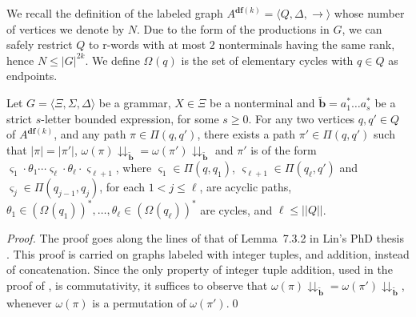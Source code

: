 \documentclass[final]{llncs}
\def\tuple#1{{\langle #1 \rangle}}
\def\card#1{{|\!|{#1}|\!|}}
\def\len#1{{\vert{#1}\vert}}
\def\prod{\Delta}
\def\patt{{\widetilde{\mathbf{b}}}}
\def\df#1{\scriptscriptstyle\mathbf{df}(#1)}
\def\Vars{\ensuremath{\Xi}}
\newcommand{\cycles}[2]{\Omega_{{#1}}({#2})}
\newcommand{\cyclestar}[2]{(\Omega_{{#1}}({#2}))^*}
\newcommand{\projpatt}[1]{{#1}\mathclose{\downdownarrows}_{{\patt}}}
\begin{document}
We recall the definition of the labeled graph
\(A^{\df{k}}= \tuple{ Q, \prod, \rightarrow}\)
whose number of vertices we denote by \(N\). Due to the form of the
productions in \(G\), we can safely restrict \(Q\) to r-words with at
most $2$ nonterminals having the same rank,
hence \(N \leq \len{G}^{2k}\). We define $\cycles{}{q}$ is the set of
elementary cycles with $q \in Q$ as endpoints.

\begin{proposition}\label{prop:weighted-graph-decomposition}
Let $G = \tuple{\Vars, \Sigma, \prod}$ be a grammar, $X \in \Vars$ be
a nonterminal and $\patt = a_1^* \ldots a_s^*$ be a strict $s$-letter bounded
expression, for some $s \geq 0$. For any two vertices
$q,q' \in Q$ of $A^{\df{k}}$, and any path
$\pi \in \Pi(q,q')$, there exists a path $\pi' \in \Pi(q,q')$ such
that $\len{\pi} = \len{\pi'}$, $\projpatt{\omega(\pi)}
= \projpatt{\omega(\pi')}$ and $\pi'$ is of the form
$\varsigma_1 \cdot \theta_1 \cdots \varsigma_\ell \cdot \theta_\ell \cdot \varsigma_{\ell+1}$,
where \(\varsigma_1 \in \Pi(q,q_{1})\), \(\varsigma_{\ell+1} \in \Pi(q_{\ell},q')\) and 
\(\varsigma_{j} \in \Pi(q_{{j-1}},q_{{j}})\), for
each \(1< j \leq \ell\), are acyclic paths,
$\theta_1 \in \cyclestar{}{q_{1}}, \ldots, \theta_\ell \in \cyclestar{}{q_{\ell}}$
are cycles, and $\ell \leq \card{Q}$.
\end{proposition}
\begin{proof} 
The proof goes along the lines of that of Lemma~7.3.2 in Lin's PhD thesis \cite{ToThesis}. This
proof is carried on graphs labeled with integer tuples, and addition,
instead of concatenation. Since the only property of integer tuple
addition, used in the proof of \cite[Lemma~7.3.2]{ToThesis}, is
commutativity, it suffices to observe that $\projpatt{\omega(\pi)}
= \projpatt{\omega(\pi')}$, whenever $\omega(\pi)$ is a permutation of
$\omega(\pi')$.\qed
\end{proof}
\end{document}
